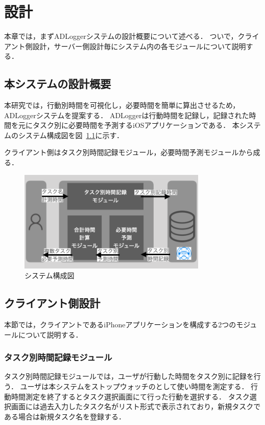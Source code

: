 \chapter{設計}
本章では，まずADLoggerシステムの設計概要について述べる．
ついで，クライアント側設計，サーバー側設計毎にシステム内の各モジュールについて説明する．

\section{本システムの設計概要}
本研究では，行動別時間を可視化し，必要時間を簡単に算出させるため，ADLoggerシステムを提案する．
ADLoggerは行動時間を記録し，記録された時間を元にタスク別に必要時間を予測するiOSアプリケーションである．
本システムのシステム構成図を図~\ref{fig:system}に示す．

クライアント側はタスク別時間記録モジュール，必要時間予測モジュールから成る．

\begin{figure}[tb]
	\begin{center}
	\includegraphics[width=9cm]{images/5/3.png}
	\end{center}
	\caption{システム構成図}
	\label{fig:system}
\end{figure}

\section{クライアント側設計}
本節では，クライアントであるiPhoneアプリケーションを構成する2つのモジュールについて説明する．

\subsection{タスク別時間記録モジュール}
タスク別時間記録モジュールでは，ユーザが行動した時間をタスク別に記録を行う．
ユーザは本システムをストップウォッチのとして使い時間を測定する．
行動時間測定を終了するとタスク選択画面にて行った行動を選択する．
タスク選択画面には過去入力したタスク名がリスト形式で表示されており，新規タスクである場合は新規タスク名を登録する．

